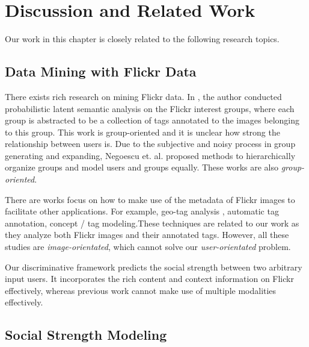 \section{Discussion and Related Work} \label{sec:ssm-discussion}

Our work in this chapter is closely related to the following research topics.

\subsection{Data Mining with Flickr Data}

There exists rich research on mining Flickr data. In \cite{civr/NegoescuG08}, the author conducted probabilistic latent semantic analysis on the Flickr interest
groups, where each group is abstracted to be a collection of tags annotated to the images belonging to this group. This work is group-oriented and it is unclear
how strong the relationship between users is. Due to the subjective and noisy process in group generating and expanding, Negoescu et. al.
\cite{mm/NegoescuAPVG09}\cite{mm/NegoescuG08} proposed methods to hierarchically organize groups and model users and groups equally. These works are also {\em group-oriented}.

There are works focus on how to make use of the metadata of Flickr images to facilitate other applications. For example, geo-tag analysis
\cite{mm/KennedyNANR07}\cite{sigir/SerdyukovMZ09}, automatic tag annotation\cite{mm/WuHJZY09}, concept / tag modeling\cite{mm/WuHYML08}.These techniques are
related to our work as they analyze both Flickr images and their annotated tags. However, all these studies are {\em image-orientated}, which cannot solve our
{\em user-orientated} problem.

Our discriminative framework predicts the social strength between two arbitrary input users. It incorporates the rich content and context information on Flickr
effectively, whereas previous work cannot make use of multiple modalities effectively.

\subsection{Social Strength Modeling}

